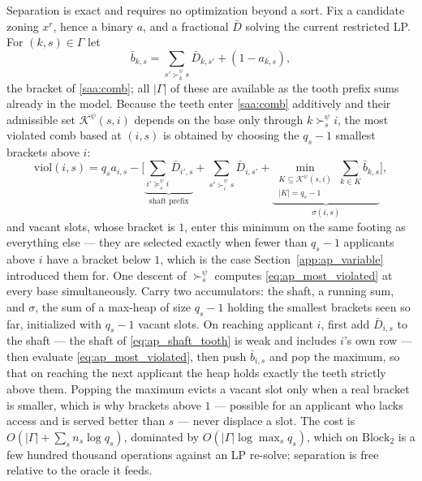 \documentclass{article}
\begin{document}
Separation is exact and requires no optimization beyond a sort. Fix a candidate zoning $x^r$, hence a binary $a$, and a fractional $\bar D$ solving the current restricted LP. For $(k,s) \in \Gamma$ let
\begin{equation}\label{eq:ap_bracket}
\bar b_{k,s} = \sum_{s' \succ_k^\psi s} \bar D_{k,s'} + (1 - a_{k,s}),
\end{equation}
the bracket of \eqref{saa:comb}; all $|\Gamma|$ of these are available as the tooth prefix sums already in the model. Because the teeth enter \eqref{saa:comb} additively and their admissible set $\mathcal{K}^\psi(s,i)$ depends on the base only through $k \succ_s^\psi i$, the most violated comb based at $(i,s)$ is obtained by choosing the $q_s - 1$ smallest brackets above $i$:
\begin{equation}\label{eq:ap_most_violated}
\mathrm{viol}(i,s) = q_s a_{i,s} - \Big[ \underbrace{\textstyle\sum_{i' \succeq_s^\psi i} \bar D_{i',s}}_{\text{shaft prefix}} + \sum_{s' \succ_i^\psi s} \bar D_{i,s'} + \underbrace{\min_{\substack{K \subseteq \mathcal{K}^\psi(s,i) \\ |K| = q_s - 1}} \sum_{k \in K} \bar b_{k,s}}_{\sigma(i,s)} \Big],
\end{equation}
and vacant slots, whose bracket is $1$, enter this minimum on the same footing as everything else --- they are selected exactly when fewer than $q_s - 1$ applicants above $i$ have a bracket below $1$, which is the case Section~\ref{app:ap_variable} introduced them for. One descent of $\succ_s^\psi$ computes \eqref{eq:ap_most_violated} at every base simultaneously. Carry two accumulators: the shaft, a running sum, and $\sigma$, the sum of a max-heap of size $q_s - 1$ holding the smallest brackets seen so far, initialized with $q_s - 1$ vacant slots. On reaching applicant $i$, first add $\bar D_{i,s}$ to the shaft --- the shaft of \eqref{eq:ap_shaft_tooth} is weak and includes $i$'s own row --- then evaluate \eqref{eq:ap_most_violated}, then push $\bar b_{i,s}$ and pop the maximum, so that on reaching the next applicant the heap holds exactly the teeth strictly above them. Popping the maximum evicts a vacant slot only when a real bracket is smaller, which is why brackets above $1$ --- possible for an applicant who lacks access and is served better than $s$ --- never displace a slot. The cost is $O(|\Gamma| + \sum_s n_s \log q_s)$, dominated by $O(|\Gamma| \log \max_s q_s)$, which on $\text{Block}_2$ is a few hundred thousand operations against an LP re-solve; separation is free relative to the oracle it feeds. 
\end{document}

